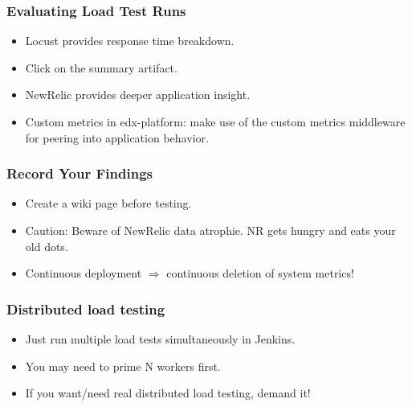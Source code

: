\documentclass{beamer}
\begin{document}
\begin{frame}
\frametitle{Evaluating Load Test Runs}
\begin{itemize}
\item Locust provides response time breakdown.\pause
\item Click on the summary artifact.
\pause
\item NewRelic provides deeper application insight.\pause
\item Custom metrics in edx-platform: make use of the custom metrics middleware
      for peering into application behavior.
\end{itemize}
\end{frame}


\begin{frame}
\frametitle{Record Your Findings}
\begin{itemize}
\item Create a wiki page before testing.\pause
\item Caution: Beware of NewRelic data atrophie. NR gets hungry and eats your
      old dots.\pause
\item Continuous deployment $\Rightarrow$ continuous deletion of system metrics!
\end{itemize}
\end{frame}


\begin{frame}
\frametitle{Distributed load testing}
\begin{itemize}
\item Just run multiple load tests simultaneously in Jenkins.\pause
\item You may need to prime N workers first.\pause
\item If you want/need real distributed load testing, demand it!
\end{itemize}
\end{frame}
\end{document}
